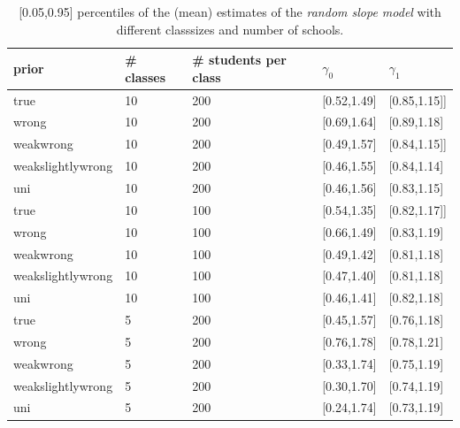 \begin{table}[H]
\begin{center}
\begin{tabular}{l l l l  l}
prior & \# classes & \#  students per class &  $\gamma_0$ & $ \gamma_1$ \\
\hline
\hline
true &10  &  200  &  [0.52,1.49]  &  [0.85,1.15]]\\
wrong& 10  &  200  &  [0.69,1.64]  &  [0.89,1.18]\\
weakwrong & 10  &  200  &  [0.49,1.57]  &  [0.84,1.15]]\\
weakslightlywrong & 10  &  200  &  [0.46,1.55]  &  [0.84,1.14]\\
uni &10  &  200  &  [0.46,1.56]  &  [0.83,1.15]\\
\hline
true &10  &  100  &  [0.54,1.35]  &  [0.82,1.17]]\\
wrong & 10  &  100  &  [0.66,1.49]  &  [0.83,1.19]\\
weakwrong & 10  &  100  &  [0.49,1.42]  &  [0.81,1.18]\\
weakslightlywrong & 10  &  100  &  [0.47,1.40]  &  [0.81,1.18]\\
uni & 10  &  100  &  [0.46,1.41]  &  [0.82,1.18]\\
\hline
true & 5  &  200  &  [0.45,1.57]  &  [0.76,1.18]\\
wrong & 5  &  200  &  [0.76,1.78]  &  [0.78,1.21]\\
weakwrong &5  &  200  &  [0.33,1.74]  &  [0.75,1.19]\\
weakslightlywrong &5  &  200  &  [0.30,1.70]  &  [0.74,1.19]\\
uni & 5  &  200  &  [0.24,1.74]  &  [0.73,1.19]\\
\end{tabular}
\end{center}
\caption{ [0.05,0.95] percentiles of the (mean) estimates of the  \emph{random slope model}  with different classsizes and number of schools. }
\label{tab:means}
\end{table}

